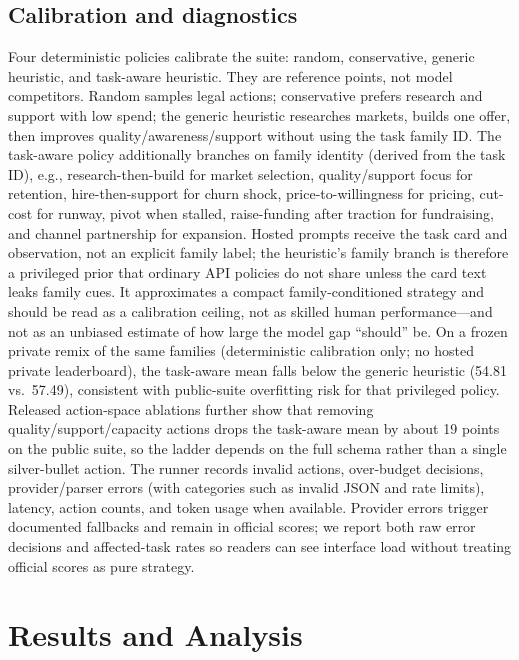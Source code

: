 \documentclass[sigconf,review]{acmart}
\begin{document}
\subsection{Calibration and diagnostics}
\label{sec:calibration}
Four deterministic policies calibrate the suite: random, conservative, generic heuristic, and task-aware heuristic.
They are reference points, not model competitors.
Random samples legal actions; conservative prefers research and support with low spend; the generic heuristic researches markets, builds one offer, then improves quality/awareness/support without using the task family ID.
The task-aware policy additionally branches on family identity (derived from the task ID), e.g., research-then-build for market selection, quality/support focus for retention, hire-then-support for churn shock, price-to-willingness for pricing, cut-cost for runway, pivot when stalled, raise-funding after traction for fundraising, and channel partnership for expansion.
Hosted prompts receive the task card and observation, not an explicit family label; the heuristic's family branch is therefore a privileged prior that ordinary API policies do not share unless the card text leaks family cues.
It approximates a compact family-conditioned strategy and should be read as a calibration ceiling, not as skilled human performance---and not as an unbiased estimate of how large the model gap ``should'' be.
On a frozen private remix of the same families (deterministic calibration only; no hosted private leaderboard), the task-aware mean falls below the generic heuristic (54.81 vs.\ 57.49), consistent with public-suite overfitting risk for that privileged policy.
Released action-space ablations further show that removing quality/support/capacity actions drops the task-aware mean by about 19 points on the public suite, so the ladder depends on the full schema rather than a single silver-bullet action.
The runner records invalid actions, over-budget decisions, provider/parser errors (with categories such as invalid JSON and rate limits), latency, action counts, and token usage when available.
Provider errors trigger documented fallbacks and remain in official scores; we report both raw error decisions and affected-task rates so readers can see interface load without treating official scores as pure strategy.

\section{Results and Analysis}

\end{document}
